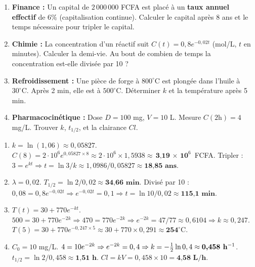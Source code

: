 \documentclass[11pt]{article}
\begin{document}
\begin{exercice}
\begin{enumerate}
    \item \textbf{Finance :} Un capital de $2\,000\,000$ FCFA est placé à un \textbf{taux annuel effectif} de $6\%$ (capitalisation continue). Calculer le capital après 8 ans et le temps nécessaire pour tripler le capital.
    \item \textbf{Chimie :} La concentration d'un réactif suit $C(t) = 0,8 e^{-0,02 t}$ (mol/L, $t$ en minutes). Calculer la demi-vie. Au bout de combien de temps la concentration est-elle divisée par 10 ?
    \item \textbf{Refroidissement :} Une pièce de forge à $800^\circ\text{C}$ est plongée dans l'huile à $30^\circ\text{C}$. Après 2 min, elle est à $500^\circ\text{C}$. Déterminer $k$ et la température après 5 min.
    \item \textbf{Pharmacocinétique :} Dose $D=100$ mg, $V=10$ L. Mesure $C(2\text{h})=4$ mg/L. Trouver $k$, $t_{1/2}$, et la clairance $Cl$.
\end{enumerate}
\end{exercice}

\begin{corrige}[Exercice n°6.8]
\begin{enumerate}
    \item $k = \ln(1,06) \approx 0,05827$. $C(8) = 2\cdot 10^6 e^{0,05827 \times 8} \approx 2\cdot 10^6 \times 1,5938 \approx \textbf{3,19 $\times$ 10}^6$ FCFA. Tripler : $3 = e^{kt} \Rightarrow t = \ln 3 / k \approx 1,0986 / 0,05827 \approx \textbf{18,85 ans}$.
    \item $\lambda = 0,02$. $T_{1/2} = \ln 2 / 0,02 \approx \textbf{34,66 min}$. Divisé par 10 : $0,08 = 0,8 e^{-0,02t} \Rightarrow e^{-0,02t}=0,1 \Rightarrow t = \ln 10 / 0,02 \approx \textbf{115,1 min}$.
    \item $T(t) = 30 + 770 e^{-kt}$. $500 = 30 + 770 e^{-2k} \Rightarrow 470 = 770 e^{-2k} \Rightarrow e^{-2k} = 47/77 \approx 0,6104 \Rightarrow k \approx 0,247$. $T(5) = 30 + 770 e^{-0,247 \times 5} \approx 30 + 770 \times 0,291 \approx \textbf{254}^\circ\text{C}$.
    \item $C_0 = 10$ mg/L. $4 = 10 e^{-2k} \Rightarrow e^{-2k} = 0,4 \Rightarrow k = -\frac{1}{2}\ln 0,4 \approx \textbf{0,458 h}\textsuperscript{$-1$}$. $t_{1/2} = \ln 2 / 0,458 \approx \textbf{1,51 h}$. $Cl = k V = 0,458 \times 10 = \textbf{4,58 L/h}$.
\end{enumerate}
\end{corrige}
\end{document}
